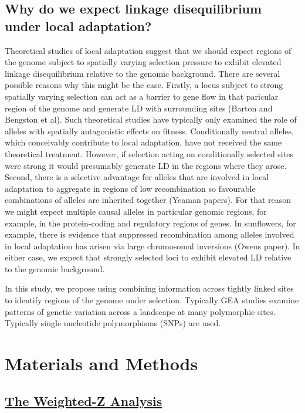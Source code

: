 \documentclass[11pt,twoside,lineno]{GSA_format}
\begin{document}
\subsection{Why do we expect linkage disequilibrium under local adaptation?}

Theoretical studies of local adaptation suggest that we should expect regions of the genome subject to spatially varying selection pressure to exhibit elevated linkage disequilibrium relative to the genomic background. There are several possible reasons why this might be the case. Firstly, a locus subject to strong spatially varying selection can act as a barrier to gene flow in that paricular region of the genome and generate LD with surrounding sites (Barton and Bengston et al). Such theoretical studies have typically only examined the role of alleles with spatially antagonistic effects on fitness. Conditionally neutral alleles, which conceivably contribute to local adaptation, have not received the same theoretical treatment. However, if selection acting on conditionally selected sites were strong it would presumably generate LD in the regions where they arose. Second, there is a selective advantage for alleles that are involved in local adaptation to aggregate in regions of low recombination so favourable combinations of alleles are inherited together (Yeaman papers). For that reason we might expect multiple causal alleles in particular genomic regions, for example, in the protein-coding and regulatory regions of genes. In sunflowers, for example, there is evidence that suppressed recombination among alleles involved in local adaptation has arisen via large chromosomal inversions (Owens paper). In either case, we expect that strongly selected loci to exhibit elevated LD relative to the genomic background.

In this study, we propose using combining information across tightly linked sites to identify regions of the genome under selection. Typically GEA studies examine patterns of genetic variation across a landscape at many polymorphic sites. Typically single nucleotide polymorphisms (SNPs) are used.
 
\section{Materials and Methods}
\label{sec:materials:methods}

\subsection{\underline{The Weighted-Z Analysis}} 
\end{document}
